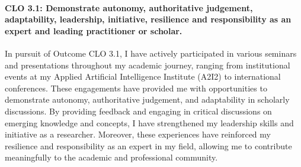 \documentclass[12pt, %
oneside]{article}
\begin{document}
\paragraph{CLO 3.1: Demonstrate autonomy, authoritative judgement, adaptability, leadership, initiative, resilience and responsibility as an expert and leading practitioner or scholar.\\} 
\noindent In pursuit of Outcome CLO 3.1, I have actively participated in various seminars and presentations throughout my academic journey, ranging from institutional events at my Applied Artificial Intelligence Institute (A2I2) to international conferences. These engagements have provided me with opportunities to demonstrate autonomy, authoritative judgement, and adaptability in scholarly discussions. By providing feedback and engaging in critical discussions on emerging knowledge and concepts, I have strengthened my leadership skills and initiative as a researcher. Moreover, these experiences have reinforced my resilience and responsibility as an expert in my field, allowing me to contribute meaningfully to the academic and professional community.
\end{document}

